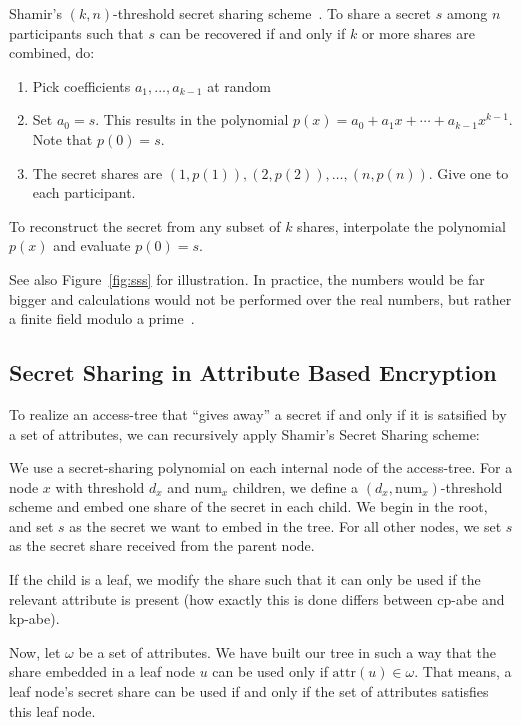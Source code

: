

\begin{definition}
    Shamir's $(k, n)$-threshold secret sharing scheme~\cite{shamir_how_1979}.
    To share a secret $s$ among $n$ participants such that $s$ can be recovered if and only if $k$ or more shares are combined, do:
    \begin{enumerate}
        \item Pick coefficients $a_1, ..., a_{k-1}$ at random 
        \item Set $a_0 = s$. This results in the polynomial $p(x) = a_0 + a_1x + \cdots + a_{k-1}x^{k-1}$. Note that $p(0) = s$.
        \item The secret shares are $(1, p(1)), (2, p(2)), \dots, (n, p(n))$. Give one to each participant.
    \end{enumerate}
    To reconstruct the secret from any subset of $k$ shares, interpolate the polynomial $p(x)$ and evaluate $p(0) = s$. 
\end{definition}

See also Figure~\ref{fig:sss} for illustration.
In practice, the numbers would be far bigger and calculations would not be performed over the real numbers, but rather a finite field modulo a prime~\cite{shamir_how_1979}.

\subsection{Secret Sharing in Attribute Based Encryption}\label{sec:lss-in-access-trees}
To realize an \gls{access-tree} that ``gives away'' a secret if and only if it is satsified by a set of attributes, we can recursively apply Shamir's Secret Sharing scheme:



We use a secret-sharing polynomial on each internal node of the \gls{access-tree}.
For a node $x$ with threshold $d_x$ and $\text{num}_x$ children, we define a $(d_x, \text{num}_x)$-threshold scheme and embed one share of the secret in each child.
We begin in the root, and set $s$ as the secret we want to embed in the tree.
For all other nodes, we set $s$ as the secret share received from the parent node.

If the child is a leaf, we modify the share such that it can only be used if the relevant attribute is present (how exactly this is done differs between \acrshort{cp-abe} and \acrshort{kp-abe}).

Now, let $\omega$ be a set of attributes.
We have built our tree in such a way that the share embedded in a leaf node $u$ can be used only if $\text{attr}(u) \in \omega$.
That means, a leaf node's secret share can be used if and only if the set of attributes satisfies this leaf node.

